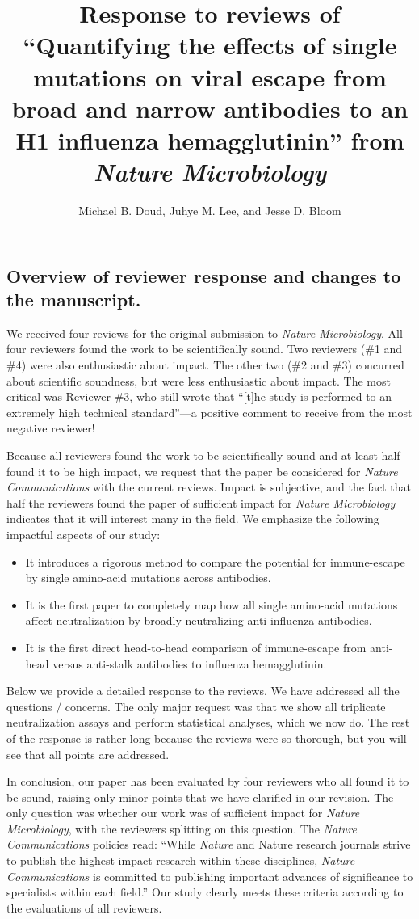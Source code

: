 \documentclass[11pt, oneside]{article}   	%
\title{Response to reviews of ``Quantifying the effects of single mutations on viral escape from broad and narrow antibodies to an H1 influenza hemagglutinin'' from \textit{Nature Microbiology}}
\author{Michael B. Doud, Juhye M. Lee, and Jesse D. Bloom}
\begin{document}
\maketitle

\subsection*{Overview of reviewer response and changes to the manuscript.}

We received four reviews for the original submission to \textit{Nature Microbiology}.
All four reviewers found the work to be scientifically sound.
Two reviewers (\#1 and \#4) were also enthusiastic about impact.
The other two (\#2 and \#3) concurred about scientific soundness, but were less enthusiastic about impact.
The most critical was Reviewer \#3, who still wrote that ``[t]he study is performed to an extremely high technical standard''---a positive comment to receive from the most negative reviewer!

Because all reviewers found the work to be scientifically sound and at least half found it to be high impact, we request that the paper be considered for \textit{Nature Communications} with the current reviews.
Impact is subjective, and the fact that half the reviewers found the paper of sufficient impact for \textit{Nature Microbiology} indicates that it will interest many in the field. 
We emphasize the following impactful aspects of our study:
\begin{itemize}\parskip1pt
\item It introduces a rigorous method to compare the potential for immune-escape by single amino-acid mutations across antibodies.
\item It is the first paper to completely map how all single amino-acid mutations affect neutralization by broadly neutralizing anti-influenza antibodies.
\item It is the first direct head-to-head comparison of immune-escape from anti-head versus anti-stalk antibodies to influenza hemagglutinin.
\end{itemize}

Below we provide a detailed response to the reviews.
We have addressed all the questions / concerns.
The only major request was that we show all triplicate neutralization assays and perform statistical analyses, which we now do.
The rest of the response is rather long because the reviews were so thorough, but you will see that all points are addressed.

In conclusion, our paper has been evaluated by four reviewers who all found it to be sound, raising only minor points that we have clarified in our revision.
The only question was whether our work was of sufficient impact for \textit{Nature Microbiology}, with the reviewers splitting on this question.
The \textit{Nature Communications} policies read: ``While \textit{Nature} and Nature research journals strive to publish the highest impact research within these disciplines, \textit{Nature Communications} is committed to publishing important advances of significance to specialists within each field.''
Our study clearly meets these criteria according to the evaluations of all reviewers.
\end{document}
